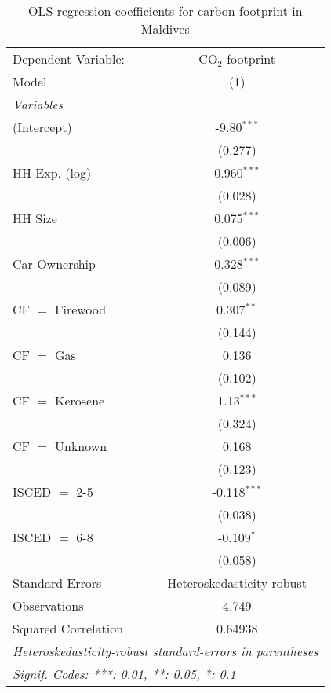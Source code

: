 
\begin{table}[htbp!]
   \centering
   \small
   \begin{adjustbox}{width = 1\textwidth, max height = 0.95\textheight, center}
      \begin{threeparttable}[b]
         \caption{\label{tab:OLS_2_MDV} OLS-regression coefficients for carbon footprint in Maldives}
         \begin{tabular}{lc}
            \tabularnewline \midrule \midrule
            Dependent Variable: & CO$_{2}$ footprint\\  
            Model               & (1)\\  
            \midrule
            \emph{Variables}\\
            (Intercept)         & -9.80$^{***}$\\   
                                & (0.277)\\   
            HH Exp. (log)       & 0.960$^{***}$\\   
                                & (0.028)\\   
            HH Size             & 0.075$^{***}$\\   
                                & (0.006)\\   
            Car Ownership       & 0.328$^{***}$\\   
                                & (0.089)\\   
            CF $=$ Firewood     & 0.307$^{**}$\\   
                                & (0.144)\\   
            CF $=$ Gas          & 0.136\\   
                                & (0.102)\\   
            CF $=$ Kerosene     & 1.13$^{***}$\\   
                                & (0.324)\\   
            CF $=$ Unknown      & 0.168\\   
                                & (0.123)\\   
            ISCED $=$ 2-5       & -0.118$^{***}$\\   
                                & (0.038)\\   
            ISCED $=$ 6-8       & -0.109$^{*}$\\   
                                & (0.058)\\   
            \midrule 
            Standard-Errors     & Heteroskedasticity-robust \\   
            Observations        & 4,749\\  
            Squared Correlation & 0.64938\\  
            \midrule \midrule
            \multicolumn{2}{l}{\emph{Heteroskedasticity-robust standard-errors in parentheses}}\\
            \multicolumn{2}{l}{\emph{Signif. Codes: ***: 0.01, **: 0.05, *: 0.1}}\\
         \end{tabular}
         

\end{threeparttable}
\end{adjustbox}
\end{table}
